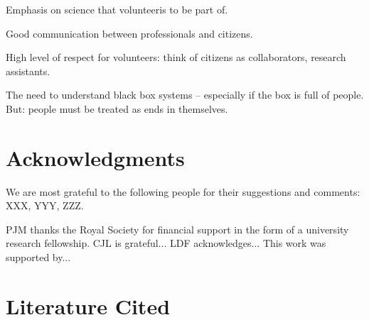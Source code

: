 \documentclass{ar2e}
\begin{document}
Emphasis on science that volunteeris to be part of. 

Good communication between professionals and citizens.

High level of respect for volunteers: think of citizens as collaborators,
research assistants.

The need to understand black box systems -- especially if the box is full of
people. But: people must be treated as ends in themselves. 


\section*{Acknowledgments}

We are most grateful to the following people for their suggestions and comments:
XXX, YYY, ZZZ. 

PJM thanks the Royal Society for financial support in the form of a university
research fellowship. 
%
CJL is grateful...
%
LDF acknowledges...
% 
This work was supported by...


\section{Literature Cited}





\end{document}
